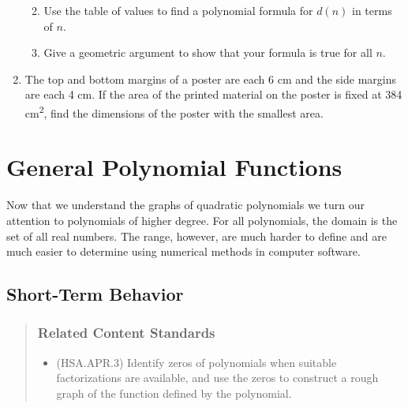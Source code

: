 \documentclass[
]{book}
\providecommand{\tightlist}{%
  \setlength{\itemsep}{0pt}\setlength{\parskip}{0pt}}
\theoremstyle{definition}
\theoremstyle{definition}
\theoremstyle{definition}
\theoremstyle{remark}
\begin{document}
\begin{enumerate}
  \begin{enumerate}
  \def\labelenumii{\alph{enumii}.}
  \tightlist
  \item
    Use the table of values to find a polynomial formula for \(d(n)\) in terms of \(n\).
  \item
    Give a geometric argument to show that your formula is true for all \(n\).
  \end{enumerate}
\item
  The top and bottom margins of a poster are each 6 cm and the side margins are each 4 cm. If the area of the printed material on the poster is fixed at 384 cm\textsuperscript{2}, find the dimensions of the poster with the smallest area.
\end{enumerate}

\hypertarget{general-polynomial-functions}{%
\section{General Polynomial Functions}\label{general-polynomial-functions}}

Now that we understand the graphs of quadratic polynomials we turn our attention to polynomials of higher degree. For all polynomials, the domain is the set of all real numbers. The range, however, are much harder to define and are much easier to determine using numerical methods in computer software.

\hypertarget{short-term-behavior}{%
\subsection{Short-Term Behavior}\label{short-term-behavior}}

\begin{quote}
\hypertarget{related-content-standards-51}{%
\subsubsection*{Related Content Standards}\label{related-content-standards-51}}

\begin{itemize}
\tightlist
\item
  (HSA.APR.3) Identify zeros of polynomials when suitable factorizations are available, and use the zeros to construct a rough graph of the function defined by the polynomial.
\end{itemize}
\end{quote}
\end{document}

